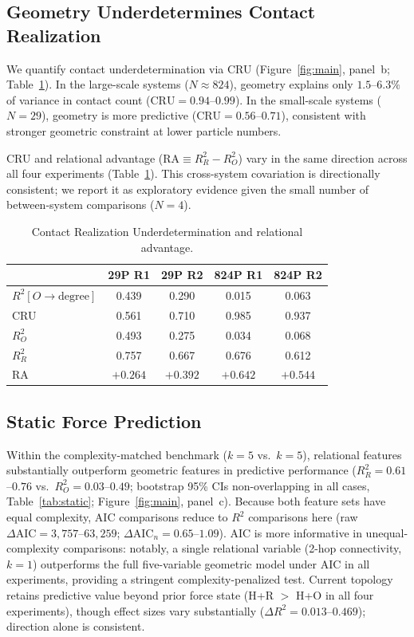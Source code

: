 \documentclass[11pt,a4paper]{article}
\begin{document}
\subsection{Geometry Underdetermines Contact Realization}

We quantify contact underdetermination via CRU (Figure~\ref{fig:main}, panel~b; Table~\ref{tab:cru}).
In the large-scale systems ($N\approx 824$), geometry explains only $1.5$--$6.3\%$ of variance in contact count ($\mathrm{CRU} = 0.94$--$0.99$).
In the small-scale systems ($N=29$), geometry is more predictive ($\mathrm{CRU} = 0.56$--$0.71$), consistent with stronger geometric constraint at lower particle numbers.

CRU and relational advantage ($\mathrm{RA} \equiv R^2_R - R^2_O$) vary in the same direction across all four experiments (Table~\ref{tab:cru}).
This cross-system covariation is directionally consistent; we report it as exploratory evidence given the small number of between-system comparisons ($N=4$).

\begin{table}[h]
\centering
\caption{Contact Realization Underdetermination and relational advantage.}
\label{tab:cru}
\begin{tabular}{lcccc}
\toprule
 & 29P R1 & 29P R2 & 824P R1 & 824P R2 \\
\midrule
$R^2[O\!\rightarrow\!\text{degree}]$ & 0.439 & 0.290 & 0.015 & 0.063 \\
CRU & 0.561 & 0.710 & 0.985 & 0.937 \\
$R^2_O$ & 0.493 & 0.275 & 0.034 & 0.068 \\
$R^2_R$ & 0.757 & 0.667 & 0.676 & 0.612 \\
RA & $+0.264$ & $+0.392$ & $+0.642$ & $+0.544$ \\
\bottomrule
\end{tabular}
\end{table}

\subsection{Static Force Prediction}

Within the complexity-matched benchmark ($k=5$ vs.\ $k=5$), relational features substantially outperform geometric features in predictive performance ($R^2_R = 0.61$--$0.76$ vs.\ $R^2_O = 0.03$--$0.49$; bootstrap 95\% CIs non-overlapping in all cases, Table~\ref{tab:static}; Figure~\ref{fig:main}, panel~c). Because both feature sets have equal complexity, AIC comparisons reduce to $R^2$ comparisons here (raw $\Delta\mathrm{AIC} = 3{,}757$--$63{,}259$; $\Delta\mathrm{AIC}_n = 0.65$--$1.09$). AIC is more informative in unequal-complexity comparisons: notably, a single relational variable (2-hop connectivity, $k=1$) outperforms the full five-variable geometric model under AIC in all experiments, providing a stringent complexity-penalized test.
Current topology retains predictive value beyond prior force state (H+R $>$ H+O in all four experiments), though effect sizes vary substantially ($\Delta R^2 = 0.013$--$0.469$); direction alone is consistent.
\end{document}
